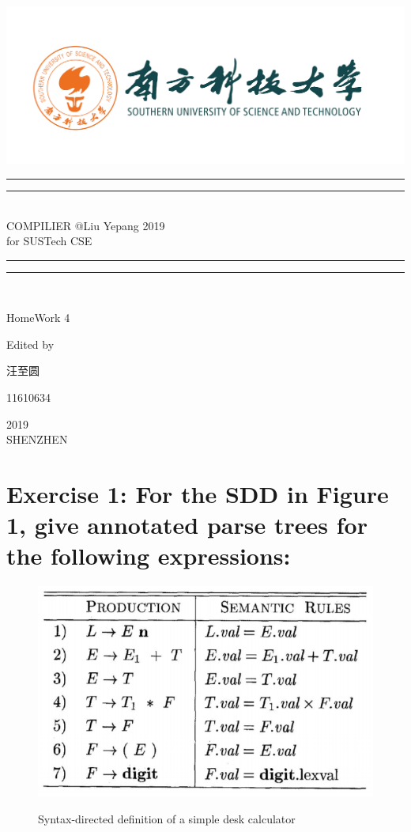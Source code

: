 \documentclass{article}
\begin{document}
 
    \begin{titlepage}       %
        \centering
        \includegraphics[width=\textwidth]{../SUSTC_LOGO.png}
        \rule{\textwidth}{1.6pt}\vspace*{-\baselineskip}\vspace*{2pt}
        \rule{\textwidth}{0.4pt}\\[\baselineskip]
        {\LARGE COMPILIER @Liu Yepang 2019\\[\baselineskip]\small for SUSTech CSE}
        \\[0.2\baselineskip]
        \rule{\textwidth}{0.4pt}\vspace*{-\baselineskip}\vspace{3.2pt}
        \rule{\textwidth}{1.6pt}\\[\baselineskip]
        \scshape
        \vspace*{\baselineskip}
        {\Large HomeWork 4\par }
        Edited by \\[\baselineskip] {汪至圆\par}
        {\Large 11610634\par }
        \vfill
        {\scshape 2019} \\{\large SHENZHEN}\par
    \end{titlepage}
    \section{Exercise 1: For the SDD in Figure 1, give annotated parse trees for the following expressions:}
        \begin{figure}[H]
            \centering
            \caption{Syntax-directed definition of a simple desk calculator}
            \includegraphics[scale=0.5]{./Q1_T.png}
            \label{fig:label}
        \end{figure}
\end{document}
